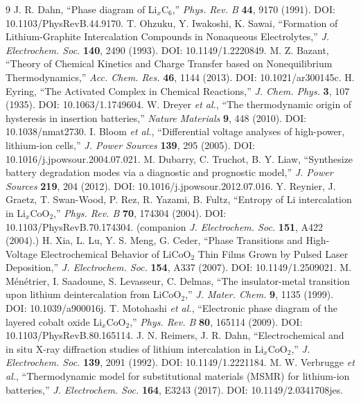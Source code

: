 \documentclass[11pt,a4paper]{article}
\begin{document}
\begin{thebibliography}{9}
 J. R. Dahn, ``Phase diagram of Li$_x$C$_6$,'' \emph{Phys. Rev. B} \textbf{44}, 9170 (1991). DOI: 10.1103/PhysRevB.44.9170.
 T. Ohzuku, Y. Iwakoshi, K. Sawai, ``Formation of Lithium-Graphite Intercalation Compounds in Nonaqueous Electrolytes,'' \emph{J. Electrochem. Soc.} \textbf{140}, 2490 (1993). DOI: 10.1149/1.2220849.
 M. Z. Bazant, ``Theory of Chemical Kinetics and Charge Transfer based on Nonequilibrium Thermodynamics,'' \emph{Acc. Chem. Res.} \textbf{46}, 1144 (2013). DOI: 10.1021/ar300145c.
 H. Eyring, ``The Activated Complex in Chemical Reactions,'' \emph{J. Chem. Phys.} \textbf{3}, 107 (1935). DOI: 10.1063/1.1749604.
 W. Dreyer \emph{et al.}, ``The thermodynamic origin of hysteresis in insertion batteries,'' \emph{Nature Materials} \textbf{9}, 448 (2010). DOI: 10.1038/nmat2730.
 I. Bloom \emph{et al.}, ``Differential voltage analyses of high-power, lithium-ion cells,'' \emph{J. Power Sources} \textbf{139}, 295 (2005). DOI: 10.1016/j.jpowsour.2004.07.021.
 M. Dubarry, C. Truchot, B. Y. Liaw, ``Synthesize battery degradation modes via a diagnostic and prognostic model,'' \emph{J. Power Sources} \textbf{219}, 204 (2012). DOI: 10.1016/j.jpowsour.2012.07.016.
 Y. Reynier, J. Graetz, T. Swan-Wood, P. Rez, R. Yazami, B. Fultz, ``Entropy of Li intercalation in Li$_x$CoO$_2$,'' \emph{Phys. Rev. B} \textbf{70}, 174304 (2004). DOI: 10.1103/PhysRevB.70.174304. (companion \emph{J. Electrochem. Soc.} \textbf{151}, A422 (2004).)
 H. Xia, L. Lu, Y. S. Meng, G. Ceder, ``Phase Transitions and High-Voltage Electrochemical Behavior of LiCoO$_2$ Thin Films Grown by Pulsed Laser Deposition,'' \emph{J. Electrochem. Soc.} \textbf{154}, A337 (2007). DOI: 10.1149/1.2509021.
 M. Ménétrier, I. Saadoune, S. Levasseur, C. Delmas, ``The insulator-metal transition upon lithium deintercalation from LiCoO$_2$,'' \emph{J. Mater. Chem.} \textbf{9}, 1135 (1999). DOI: 10.1039/a900016j.
 T. Motohashi \emph{et al.}, ``Electronic phase diagram of the layered cobalt oxide Li$_x$CoO$_2$,'' \emph{Phys. Rev. B} \textbf{80}, 165114 (2009). DOI: 10.1103/PhysRevB.80.165114.
 J. N. Reimers, J. R. Dahn, ``Electrochemical and in situ X-ray diffraction studies of lithium intercalation in Li$_x$CoO$_2$,'' \emph{J. Electrochem. Soc.} \textbf{139}, 2091 (1992). DOI: 10.1149/1.2221184.
 M. W. Verbrugge \emph{et al.}, ``Thermodynamic model for substitutional materials (MSMR) for lithium-ion batteries,'' \emph{J. Electrochem. Soc.} \textbf{164}, E3243 (2017). DOI: 10.1149/2.0341708jes.
\end{thebibliography}
\end{document}
